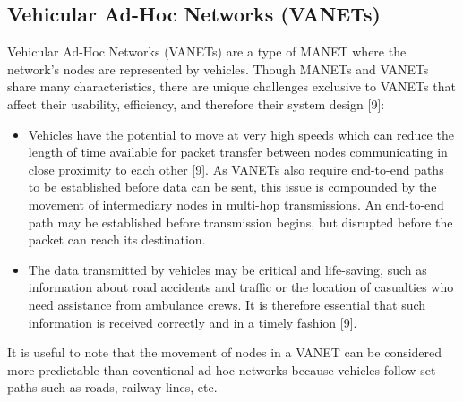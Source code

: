 \documentclass{article}
\begin{document}
\subsection{Vehicular Ad-Hoc Networks (VANETs)}
Vehicular Ad-Hoc Networks (VANETs) are a type of MANET where the network's nodes are represented by vehicles. Though MANETs and VANETs share many characteristics, there are unique challenges exclusive to VANETs that affect their usability, efficiency, and therefore their system design [9]:
\begin{itemize}
	\item Vehicles have the potential to move at very high speeds which can reduce the length of time available for packet transfer between nodes communicating in close proximity to each other [9]. As VANETs also require end-to-end paths to be established before data can be sent, this issue is compounded by the movement of intermediary nodes in multi-hop transmissions. An end-to-end path may be established before transmission begins, but disrupted before the packet can reach its destination.
	\item The data transmitted by vehicles may be critical and life-saving, such as information about road accidents and traffic or the location of casualties who need assistance from ambulance crews. It is therefore essential that such information is received correctly and in a timely fashion [9].
\end{itemize}
It is useful to note that the movement of nodes in a VANET can be considered more predictable than coventional ad-hoc networks because vehicles follow set paths such as roads, railway lines, etc.
\end{document}
